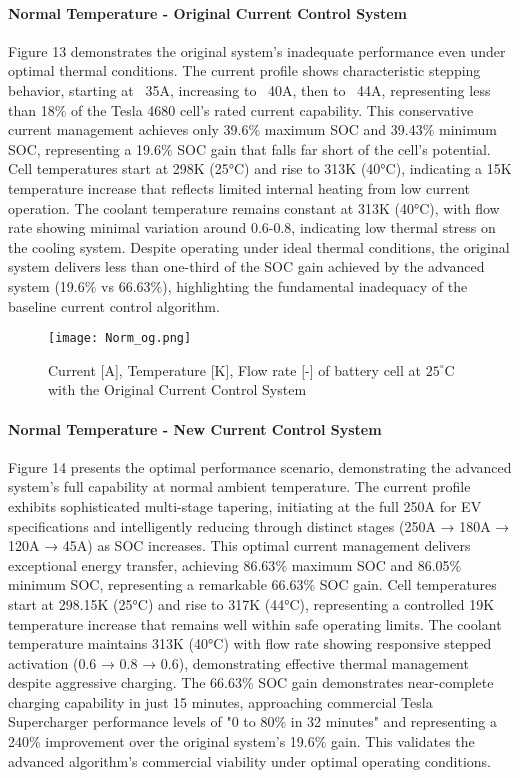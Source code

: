 \documentclass[conference]{IEEEtran}
\begin{document}
\paragraph{\textbf{Normal Temperature - Original Current Control System}}
Figure 13 demonstrates the original system's inadequate performance even under optimal thermal conditions. The current profile shows characteristic stepping behavior, starting at ~35A, increasing to ~40A, then to ~44A, representing less than 18$\%$ of the Tesla 4680 cell's rated current capability. This conservative current management achieves only 39.6$\%$ maximum SOC and 39.43$\%$ minimum SOC, representing a 19.6$\%$ SOC gain that falls far short of the cell's potential.
Cell temperatures start at 298K (25°C) and rise to 313K (40°C), indicating a 15K temperature increase that reflects limited internal heating from low current operation. The coolant temperature remains constant at 313K (40°C), with flow rate showing minimal variation around 0.6-0.8, indicating low thermal stress on the cooling system. Despite operating under ideal thermal conditions, the original system delivers less than one-third of the SOC gain achieved by the advanced system (19.6$\%$ vs 66.63$\%$), highlighting the fundamental inadequacy of the baseline current control algorithm.

\begin{figure}[H]
    \centering
    \texttt{[image: Norm\_og.png]}
    \caption{Current [A], Temperature [K], Flow rate [-] of battery cell at $25^\circ$C with the Original Current Control System }
    \label{fig:enter-label}
\end{figure}

\paragraph{\textbf{Normal Temperature - New Current Control System}}
Figure 14 presents the optimal performance scenario, demonstrating the advanced system's full capability at normal ambient temperature. The current profile exhibits sophisticated multi-stage tapering, initiating at the full 250A for EV specifications and intelligently reducing through distinct stages (250A → 180A → 120A → 45A) as SOC increases. This optimal current management delivers exceptional energy transfer, achieving 86.63$\%$ maximum SOC and 86.05$\%$ minimum SOC, representing a remarkable 66.63$\%$ SOC gain.
Cell temperatures start at 298.15K (25°C) and rise to 317K (44°C), representing a controlled 19K temperature increase that remains well within safe operating limits. The coolant temperature maintains 313K (40°C) with flow rate showing responsive stepped activation (0.6 → 0.8 → 0.6), demonstrating effective thermal management despite aggressive charging. The 66.63$\%$ SOC gain demonstrates near-complete charging capability in just 15 minutes, approaching commercial Tesla Supercharger performance levels of "0 to 80$\%$ in 32 minutes" \cite{kane2022report} and representing a 240$\%$ improvement over the original system's 19.6$\%$ gain. This validates the advanced algorithm's commercial viability under optimal operating conditions.
\end{document}
